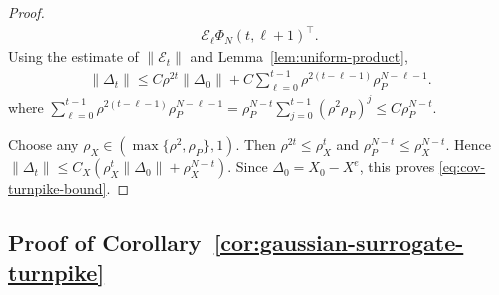 \documentclass[10pt,journal,twoside]{IEEEtran}
\theoremstyle{definition}
\theoremstyle{remark}
\begin{document}
\begin{proof}
\begin{equation*}
\begin{aligned}
			\mathcal E_\ell
			\Phi_N(t,\ell\!+\!1)^\top .
		\end{aligned}
	\end{equation*}
	Using the estimate of $\|\mathcal{E}_t\|$ and  Lemma~\ref{lem:uniform-product},
	\begin{equation}
		\begin{aligned}
			\|\Delta_t\|
			\le
			C\rho^{2t}\|\Delta_0\|+
			C
			\sum_{\ell=0}^{t-1}
			\rho^{2(t-\ell-1)}
			\rho_P^{N-\ell-1}.
		\end{aligned}
		\label{eq:Delta-cov-bound-before-sum}
	\end{equation}
	where
		$\sum_{\ell=0}^{t-1}
		\rho^{2(t-\ell-1)}
		\rho_P^{N-\ell-1}
		=\rho_P^{N-t}
		\sum_{j=0}^{t-1}
		(\rho^2\rho_P)^j \le C\rho_P^{N-t}.$
        
	Choose any \(\rho_X\in(\max\{\rho^2,\rho_P\},1)\). Then
	\(\rho^{2t}\le\rho_X^t\) and
	\(\rho_P^{N-t}\le\rho_X^{N-t}\). Hence
	$\|\Delta_t\|\le C_X\left(\rho_X^t\|\Delta_0\|+\rho_X^{N-t}\right)$.
	Since \(\Delta_0=X_0-X^e\), this proves
	\eqref{eq:cov-turnpike-bound}.
\end{proof}



\subsection{Proof of Corollary~\ref{cor:gaussian-surrogate-turnpike}}
\label{app:cro1}
\end{document}
